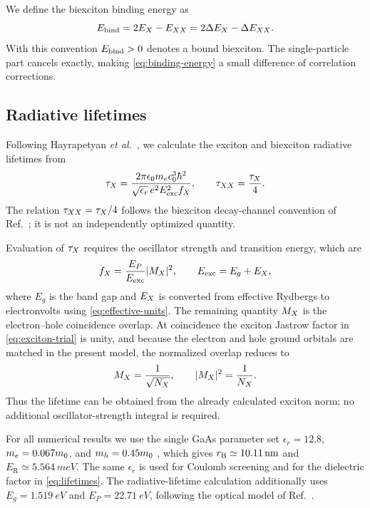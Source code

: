We define the biexciton binding energy as
\begin{equation}
 E_{\mathrm{bind}}=2E_X-E_{XX}
       =2\Delta E_X-\Delta E_{XX}.
 \label{eq:binding-energy}
\end{equation}
With this convention $E_{\mathrm{bind}}>0$ denotes a bound biexciton. The
single-particle part cancels exactly, making \cref{eq:binding-energy} a small
difference of correlation corrections.

\subsection{Radiative lifetimes}
\label{sec:observables}

Following Hayrapetyan \textit{et al.}\ \cite{hayrapetyan2019}, we calculate the exciton and biexciton radiative lifetimes from
\begin{equation}
 \tau_X=
 \frac{2\pi\epsilon_0m_e c_0^3\hbar^2}
 {\sqrt{\epsilon_r}\,e^2
 E_{\mathrm{exc}}^2f_X},
 \qquad
 \tau_{XX}=\frac{\tau_X}{4}.
 \label{eq:lifetimes}
\end{equation}
The relation $\tau_{XX}=\tau_X/4$ follows the biexciton decay-channel convention
of Ref.~\cite{hayrapetyan2019}; it is not an independently optimized quantity.

Evaluation of $\tau_X$ requires the oscillator strength and transition energy,
which are
\begin{equation}
 f_X=\frac{E_P}{E_{\mathrm{exc}}}|M_X|^2,\qquad
 E_{\mathrm{exc}}=E_g+E_X,
 \label{eq:oscillator-strength}
\end{equation}
where $E_g$ is the band gap and $E_X$ is converted from effective Rydbergs
to electronvolts using \cref{eq:effective-units}. The remaining quantity
$M_X$ is the electron--hole coincidence overlap. At
coincidence the exciton Jastrow factor in \cref{eq:exciton-trial} is unity,
and because the electron and hole ground orbitals are matched in the present
model, the normalized overlap reduces to
\begin{equation}
 M_X=\frac{1}{\sqrt{N_X}},\qquad
 |M_X|^2=\frac{1}{N_X}.
 \label{eq:coincidence-overlap}
\end{equation}
Thus the lifetime can be obtained from the already calculated exciton norm;
no additional oscillator-strength integral is required.

For all numerical results we use the single GaAs parameter set
$\epsilon_r=12.8$, $m_e=0.067m_0$, and $m_h=0.45m_0$
\cite{vurgaftman2001}, which gives
$r_{\mathrm B}\simeq\SI{10.11}{nm}$ and
$E_{\mathrm R}\simeq\SI{5.564}{meV}$. The same $\epsilon_r$ is used for
Coulomb screening and for the dielectric factor in \cref{eq:lifetimes}.
The radiative-lifetime calculation additionally uses
$E_g=\SI{1.519}{eV}$ and $E_P=\SI{22.71}{eV}$, following the optical model
of Ref.~\cite{hayrapetyan2019}.
